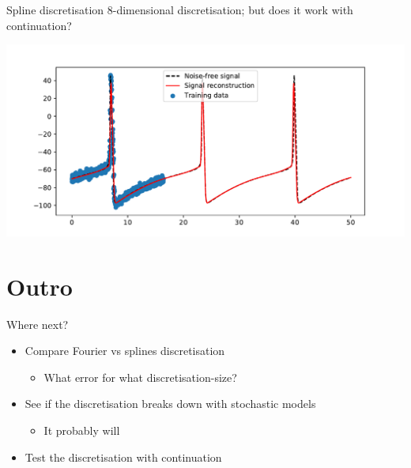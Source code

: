 \documentclass[presentation]{beamer}
\begin{document}
\begin{frame}[label={sec:orgdb53b41}]{Spline discretisation}
8-dimensional discretisation; but does it work with continuation?
\begin{center}
\includegraphics[width=.9\linewidth]{./HHdisc.pdf}
\end{center}
\end{frame}
\section{Outro}
\label{sec:orgfdebd32}
\begin{frame}[label={sec:orgfcc8af7}]{Where next?}
\begin{itemize}
\item Compare Fourier vs splines discretisation
\begin{itemize}
\item What error for what discretisation-size?
\end{itemize}
\item See if the discretisation breaks down with stochastic models
\begin{itemize}
\item It probably will
\end{itemize}
\item Test the discretisation with continuation
\end{itemize}
\end{frame}
\end{document}
